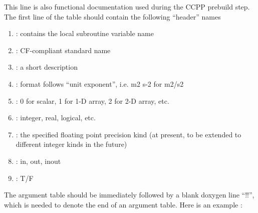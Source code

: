 \documentclass[letterpaper,10pt,english]{sphinxmanual}
\begin{document}
\begin{sphinxVerbatim}[commandchars=\\\{\}]
\end{sphinxVerbatim}

This line is also functional documentation used during the CCPP prebuild step.  The
first line of the table should contain the following “header” names
\begin{enumerate}
\def\theenumi{\alph{enumi}}
\def\labelenumi{\theenumi .}
\makeatletter\def\p@enumii{\p@enumi \theenumi .}\makeatother
\item {} 
: contains the local subroutine variable name

\item {} 
: CF-compliant standard name

\item {} 
: a short description

\item {} 
: format follows “unit exponent”, i.e. m2 s-2 for m2/s2

\item {} 
: 0 for scalar, 1 for 1-D array, 2 for 2-D array, etc.

\item {} 
: integer, real, logical, etc.

\item {} 
: the specified floating point precision kind (at present, to be
extended to different integer kinds in the future)

\item {} 
: in, out, inout

\item {} 
: T/F

\end{enumerate}

The argument table should be immediately followed by a blank doxygen line “!!”,
which is needed to denote the end of an argument table. Here is an example :
\end{document}
